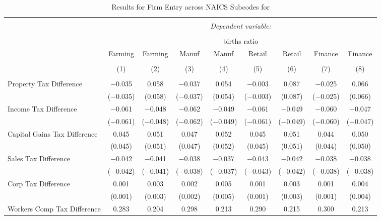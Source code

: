 
\begin{table}[!htbp] \centering 
  \caption{Results for Firm Entry across NAICS Subcodes for } 
  \label{naics} 
\small 
\begin{tabular}{@{\extracolsep{5pt}}lcccccccc} 
\\[-1.8ex]\hline 
\hline \\[-1.8ex] 
 & \multicolumn{8}{c}{\textit{Dependent variable:}} \\ 
\cline{2-9} 
\\[-1.8ex] & \multicolumn{8}{c}{births ratio} \\ 
 & Farming & Farming & Manuf & Manuf & Retail & Retail & Finance & Finance \\ 
\\[-1.8ex] & (1) & (2) & (3) & (4) & (5) & (6) & (7) & (8)\\ 
\hline \\[-1.8ex] 
 Property Tax Difference & $-$0.035 & 0.058 & $-$0.037 & 0.054 & $-$0.003 & 0.087 & $-$0.025 & 0.066 \\ 
  & ($-$0.035) & (0.058) & ($-$0.037) & (0.054) & ($-$0.003) & (0.087) & ($-$0.025) & (0.066) \\ 
  Income Tax Difference & $-$0.061 & $-$0.048 & $-$0.062 & $-$0.049 & $-$0.061 & $-$0.049 & $-$0.060 & $-$0.047 \\ 
  & ($-$0.061) & ($-$0.048) & ($-$0.062) & ($-$0.049) & ($-$0.061) & ($-$0.049) & ($-$0.060) & ($-$0.047) \\ 
  Capital Gains Tax Difference & 0.045 & 0.051 & 0.047 & 0.052 & 0.045 & 0.051 & 0.044 & 0.050 \\ 
  & (0.045) & (0.051) & (0.047) & (0.052) & (0.045) & (0.051) & (0.044) & (0.050) \\ 
  Sales Tax Difference & $-$0.042 & $-$0.041 & $-$0.038 & $-$0.037 & $-$0.043 & $-$0.042 & $-$0.038 & $-$0.038 \\ 
  & ($-$0.042) & ($-$0.041) & ($-$0.038) & ($-$0.037) & ($-$0.043) & ($-$0.042) & ($-$0.038) & ($-$0.038) \\ 
  Corp Tax Difference & 0.001 & 0.003 & 0.002 & 0.005 & 0.001 & 0.003 & 0.001 & 0.004 \\ 
  & (0.001) & (0.003) & (0.002) & (0.005) & (0.001) & (0.003) & (0.001) & (0.004) \\ 
  Workers Comp Tax Difference & 0.283 & 0.204 & 0.298 & 0.213 & 0.290 & 0.215 & 0.300 & 0.213 \\ 

\end{tabular}
\end{table}
